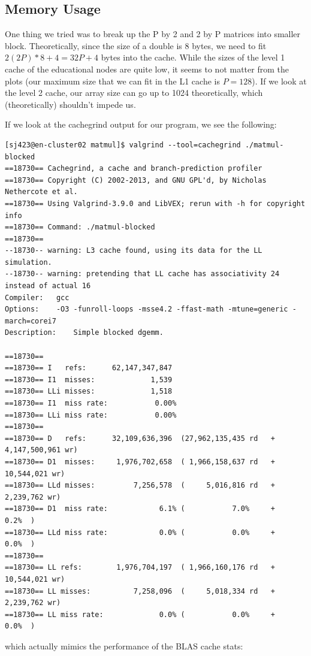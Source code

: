 \documentclass{article}
\begin{document}
    \subsection{Memory Usage}

    One thing we tried was to break up the P by 2 and 2 by P matrices into smaller block. Theoretically, since the size of a double is 8 bytes, we need to fit
    $2(2P)*8 + 4 = 32P + 4$ bytes into the cache. While the sizes of the level 1 cache of the educational nodes are quite low, it seems to not matter from the plots (our maximum
    size that we can fit in the L1 cache is $P=128$). If we look at the level 2 cache, our array size can go up to 1024 theoretically, which (theoretically) shouldn't
    impede us.

    If we look at the cachegrind output for our program, we see the following:
    \begin{lstlisting}
[sj423@en-cluster02 matmul]$ valgrind --tool=cachegrind ./matmul-blocked
==18730== Cachegrind, a cache and branch-prediction profiler
==18730== Copyright (C) 2002-2013, and GNU GPL'd, by Nicholas Nethercote et al.
==18730== Using Valgrind-3.9.0 and LibVEX; rerun with -h for copyright info
==18730== Command: ./matmul-blocked
==18730== 
--18730-- warning: L3 cache found, using its data for the LL simulation.
--18730-- warning: pretending that LL cache has associativity 24 instead of actual 16
Compiler:	gcc
Options:	-O3 -funroll-loops -msse4.2 -ffast-math -mtune=generic -march=corei7
Description:	Simple blocked dgemm.

==18730== 
==18730== I   refs:      62,147,347,847
==18730== I1  misses:             1,539
==18730== LLi misses:             1,518
==18730== I1  miss rate:           0.00%
==18730== LLi miss rate:           0.00%
==18730== 
==18730== D   refs:      32,109,636,396  (27,962,135,435 rd   + 4,147,500,961 wr)
==18730== D1  misses:     1,976,702,658  ( 1,966,158,637 rd   +    10,544,021 wr)
==18730== LLd misses:         7,256,578  (     5,016,816 rd   +     2,239,762 wr)
==18730== D1  miss rate:            6.1% (           7.0%     +           0.2%  )
==18730== LLd miss rate:            0.0% (           0.0%     +           0.0%  )
==18730== 
==18730== LL refs:        1,976,704,197  ( 1,966,160,176 rd   +    10,544,021 wr)
==18730== LL misses:          7,258,096  (     5,018,334 rd   +     2,239,762 wr)
==18730== LL miss rate:             0.0% (           0.0%     +           0.0%  )
    \end{lstlisting}

    which actually mimics the performance of the BLAS cache stats:
\end{document}
